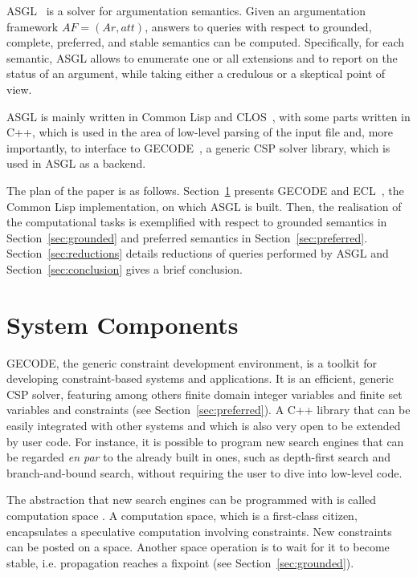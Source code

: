 \documentclass[runningheads,a4paper]{llncs}
\begin{document}
ASGL~\cite{asgl} is a solver for argumentation semantics. Given an
argumentation framework $AF = (Ar, att)$, answers to queries with
respect to grounded, complete, preferred, and stable semantics can be
computed. Specifically, for each semantic, ASGL allows to enumerate
one or all extensions and to report on the status of an argument,
while taking either a credulous or a skeptical point of view.

ASGL is mainly written in Common Lisp and CLOS~\cite{Steele:1990:CLL},
with some parts written in C++, which is used in the area of low-level
parsing of the input file and, more importantly, to interface to
GECODE~\cite{gecode}, a generic CSP solver library, which is used in ASGL as a
backend.

The plan of the paper is as follows. Section~\ref{sec:components}
presents GECODE and ECL~\cite{ecl}, the Common Lisp implementation, on
which ASGL is built. Then, the realisation of the computational tasks
is exemplified with respect to grounded semantics in
Section~\ref{sec:grounded} and preferred semantics in
Section~\ref{sec:preferred}. Section~\ref{sec:reductions} details
reductions of queries performed by ASGL and
Section~\ref{sec:conclusion} gives a brief conclusion.

\section{System Components}\label{sec:components}

GECODE, the generic constraint development environment,
is a toolkit for developing constraint-based systems and
applications. It is an efficient, generic CSP solver, featuring among
others finite domain integer variables and finite set variables and
constraints (see Section~\ref{sec:preferred}). A C++ library that can
be easily integrated with other systems and which is also very open to
be extended by user code. For instance, it is possible to program new
search engines that can be regarded \textit{en par} to the already
built in ones, such as depth-first search and branch-and-bound search,
without requiring the user to dive into low-level code.

The abstraction that new search engines can be programmed with is
called computation space \cite{Engines:97}. A computation space, which
is a first-class citizen, encapsulates a speculative computation
involving constraints. New constraints can be posted on a
space. Another space operation is to wait for it to become stable,
i.e. propagation reaches a fixpoint (see Section~\ref{sec:grounded}).
\end{document}
